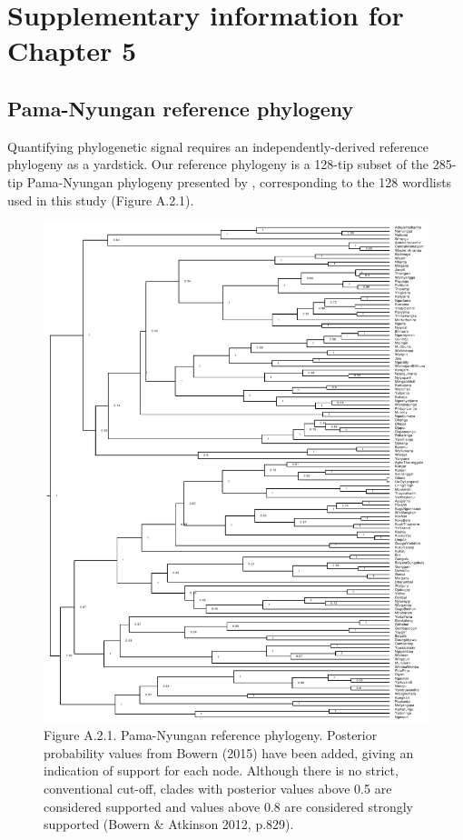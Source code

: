 \chapter{Supplementary information for Chapter 5}

\hypertarget{pama-nyungan-reference-phylogeny}{%
\section{Pama-Nyungan reference
phylogeny}\label{pama-nyungan-reference-phylogeny}}

Quantifying phylogenetic signal requires an independently-derived
reference phylogeny as a yardstick. Our reference phylogeny is a 128-tip
subset of the 285-tip Pama-Nyungan phylogeny presented by
\textcite{bowern_pama-nyungan_2015}, corresponding to the 128 wordlists
used in this study (Figure A.2.1).

\begin{figure}
\includegraphics[width=1\linewidth]{Appendix-B/fig/PN_tree_with_posteriors} \caption{Figure A.2.1. Pama-Nyungan reference phylogeny. Posterior probability values from Bowern (2015) have been added, giving an indication of support for each node. Although there is no strict, conventional cut-off, clades with posterior values above 0.5 are considered supported and values above 0.8 are considered strongly supported (Bowern \& Atkinson 2012, p.829).}\label{fig:plot-ref-tree2}
\end{figure}

